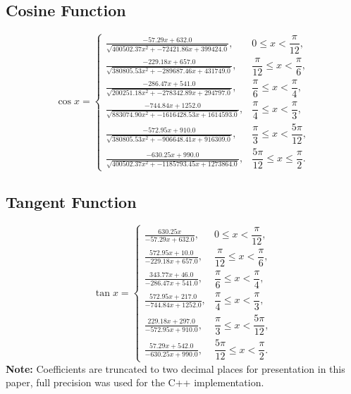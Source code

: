 \documentclass[12pt,twoside, letterpaper, margin=1in]{article}
\begin{document}
\subsection*{Cosine Function}
\[
\cos x =
\begin{cases}
\displaystyle \frac{-57.29 x + 632.0}{\sqrt{400502.37 x^2 + -72421.86 x + 399424.0}}, & 0 \le x < \dfrac{\pi}{12}, \\[3ex]
\displaystyle \frac{-229.18 x + 657.0}{\sqrt{380805.53 x^2 + -289687.46 x + 431749.0}}, & \dfrac{\pi}{12} \le x < \dfrac{\pi}{6}, \\[3ex]
\displaystyle \frac{-286.47 x + 541.0}{\sqrt{200251.18 x^2 + -278342.89 x + 294797.0}}, & \dfrac{\pi}{6} \le x < \dfrac{\pi}{4}, \\[3ex]
\displaystyle \frac{-744.84 x + 1252.0}{\sqrt{883074.90 x^2 + -1616428.53 x + 1614593.0}}, & \dfrac{\pi}{4} \le x < \dfrac{\pi}{3}, \\[3ex]
\displaystyle \frac{-572.95 x + 910.0}{\sqrt{380805.53 x^2 + -906648.41 x + 916309.0}}, & \dfrac{\pi}{3} \le x < \dfrac{5\pi}{12}, \\[3ex]
\displaystyle \frac{-630.25 x + 990.0}{\sqrt{400502.37 x^2 + -1185793.45 x + 1273864.0}}, & \dfrac{5\pi}{12} \le x \le \dfrac{\pi}{2}.
\end{cases}
\]

\subsection*{Tangent Function}
\[
\tan x =
\begin{cases}
\displaystyle \frac{630.25 x}{-57.29 x + 632.0}, & 0 \le x < \dfrac{\pi}{12}, \\[3ex]
\displaystyle \frac{572.95 x + 10.0}{-229.18 x + 657.0}, & \dfrac{\pi}{12} \le x < \dfrac{\pi}{6}, \\[3ex]
\displaystyle \frac{343.77 x + 46.0}{-286.47 x + 541.0}, & \dfrac{\pi}{6} \le x < \dfrac{\pi}{4}, \\[3ex]
\displaystyle \frac{572.95 x + 217.0}{-744.84 x + 1252.0}, & \dfrac{\pi}{4} \le x < \dfrac{\pi}{3}, \\[3ex]
\displaystyle \frac{229.18 x + 297.0}{-572.95 x + 910.0}, & \dfrac{\pi}{3} \le x < \dfrac{5\pi}{12}, \\[3ex]
\displaystyle \frac{57.29 x + 542.0}{-630.25 x + 990.0}, & \dfrac{5\pi}{12} \le x < \dfrac{\pi}{2}.
\end{cases}
\]
\vspace{1mm}
{\small \textbf{Note:} Coefficients are truncated to two decimal places for presentation in this paper, full precision was used for the C++ implementation\cite{gitcode}.}
\end{document}
